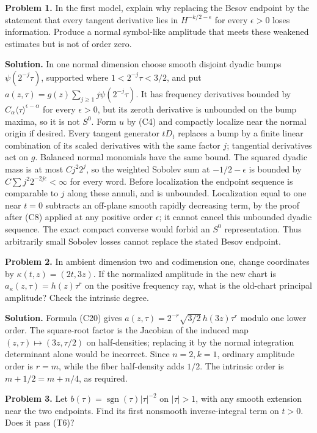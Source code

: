 \documentclass[
  11pt,
]{article}
\begin{document}
\textbf{Problem 1.} In the first model, explain why replacing the Besov
endpoint by the statement that every tangent derivative lies in
\(H^{-k/2-\epsilon}\) for every \(\epsilon>0\) loses information.
Produce a normal symbol-like amplitude that meets these weakened
estimates but is not of order zero.

\textbf{Solution.} In one normal dimension choose smooth disjoint dyadic
bumps \(\psi(2^{-j}\tau)\), supported where \(1<2^{-j}\tau<3/2\), and
put \(a(z,\tau)=g(z)\sum_{j\geq1}j\psi(2^{-j}\tau)\). It has frequency
derivatives bounded by \(C_\alpha\langle\tau\rangle^{\epsilon-\alpha}\)
for every \(\epsilon>0\), but its zeroth derivative is unbounded on the
bump maxima, so it is not \(S^0\). Form \(u\) by (C4) and compactly
localize near the normal origin if desired. Every tangent generator
\(tD_t\) replaces a bump by a finite linear combination of its scaled
derivatives with the same factor \(j\); tangential derivatives act on
\(g\). Balanced normal monomials have the same bound. The squared dyadic
mass is at most \(C j^2 2^j\), so the weighted Sobolev sum at
\(-1/2-\epsilon\) is bounded by \(C\sum j^2 2^{-2j\epsilon}<\infty\) for
every word. Before localization the endpoint sequence is comparable to
\(j\) along these annuli, and is unbounded. Localization equal to one
near \(t=0\) subtracts an off-plane smooth rapidly decreasing term, by
the proof after (C8) applied at any positive order \(\epsilon\); it
cannot cancel this unbounded dyadic sequence. The exact compact converse
would forbid an \(S^0\) representation. Thus arbitrarily small Sobolev
losses cannot replace the stated Besov endpoint.

\textbf{Problem 2.} In ambient dimension two and codimension one, change
coordinates by \(\kappa(t,z)=(2t,3z)\). If the normalized amplitude in
the new chart is \(a_\kappa(z,\tau)=h(z)\tau^r\) on the positive
frequency ray, what is the old-chart principal amplitude? Check the
intrinsic degree.

\textbf{Solution.} Formula (C20) gives
\(a(z,\tau)=2^{-r}\sqrt{3/2}\,h(3z)\tau^r\) modulo one lower order. The
square-root factor is the Jacobian of the induced map
\((z,\tau)\mapsto(3z,\tau/2)\) on half-densities; replacing it by the
normal integration determinant alone would be incorrect. Since
\(n=2,k=1\), ordinary amplitude order is \(r=m\), while the fiber
half-density adds \(1/2\). The intrinsic order is \(m+1/2=m+n/4\), as
required.

\textbf{Problem 3.} Let \(b(\tau)=\operatorname{sgn}(\tau)|\tau|^{-2}\)
on \(|\tau|>1\), with any smooth extension near the two endpoints. Find
its first nonsmooth inverse-integral term on \(t>0\). Does it pass (T6)?
\end{document}
